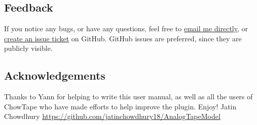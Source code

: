 \documentclass[landscape,twocolumn,a5paper]{manual}
\begin{document}
\subsection{Feedback}
If you notice any bugs, or have any questions, feel free
to \href{mailto:jatin@ccrma.stanford.edu}{email me directly},
or \href{https://github.com/jatinchowdhury18/AnalogTapeModel/issues}{create an issue ticket}
on GitHub. GitHub issues are preferred, since they are publicly
visible.

\subsection{Acknowledgements}
Thanks to Yann for helping to write this user manual,
as well as all the users of ChowTape who have made
efforts to help improve the plugin.
\newpar
Enjoy!
\newpar
Jatin Chowdhury
\newpar
\href{https://github.com/jatinchowdhury18/AnalogTapeModel}{https://github.com/jatinchowdhury18/AnalogTapeModel}
\end{document}
